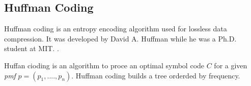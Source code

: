 \subsection{Huffman Coding}
\label{sec:huffman_coding}

Huffman coding is an entropy  encoding algorithm used for lossless data
compression.  It was developed by David A. Huffman while he was a Ph.D.
student at MIT. \cite{huf52}.

Huffan cioding is an algorithm to proce an  optimal symbol code $C$ for a given 
\emph{pmf} $ p = (p_1,....,p_n) $.  Huffman coding builds a tree orderded by frequency.



